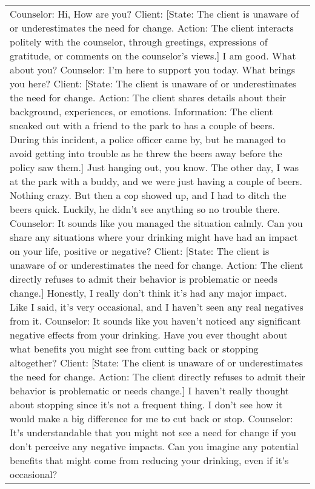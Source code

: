 \begin{table*}[tb]
\begin{tabularx}{\textwidth}{X}
\toprule
Counselor: Hi, How are you? \newline
Client: {\color{blue} [State: The client is unaware of or underestimates the need for change. Action: The client interacts politely with the counselor, through greetings, expressions of gratitude, or comments on the counselor’s views.]} I am good. What about you? \newline
Counselor: I'm here to support you today. What brings you here?  \newline
Client: {\color{blue} [State: The client is unaware of or underestimates the need for change. Action: The client shares details about their background, experiences, or emotions. Information: The client sneaked out with a friend to the park to has a couple of beers. During this incident, a police officer came by, but he managed to avoid getting into trouble as he threw the beers away before the policy saw them.]} Just hanging out, you know. The other day, I was at the park with a buddy, and we were just having a couple of beers. Nothing crazy. But then a cop showed up, and I had to ditch the beers quick. Luckily, he didn’t see anything so no trouble there. \newline
Counselor: It sounds like you managed the situation calmly. Can you share any situations where your drinking might have had an impact on your life, positive or negative? \newline 
Client: {\color{blue} [State: The client is unaware of or underestimates the need for change. Action: The client directly refuses to admit their behavior is problematic or needs change.]} Honestly, I really don’t think it’s had any major impact. Like I said, it’s very occasional, and I haven’t seen any real negatives from it. \newline
Counselor: It sounds like you haven't noticed any significant negative effects from your drinking. Have you ever thought about what benefits you might see from cutting back or stopping altogether?  \newline
Client: {\color{blue} [State: The client is unaware of or underestimates the need for change. Action: The client directly refuses to admit their behavior is problematic or needs change.]} I haven’t really thought about stopping since it’s not a frequent thing. I don't see how it would make a big difference for me to cut back or stop. \newline
Counselor: It's understandable that you might not see a need for change if you don't perceive any negative impacts. Can you imagine any potential benefits that might come from reducing your drinking, even if it's occasional?  \newline

\end{tabularx}
\end{table*}
